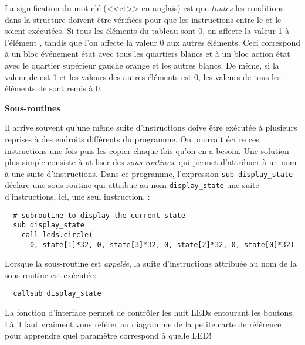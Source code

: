 La signification du mot-clé  (<<et>> en anglais) est que \emph{toutes} les conditions dans 
la structure  doivent être vérifiées pour que les instructions entre le
 et le  soient exécutées.
Si tous les éléments du tableau  sont 0, on affecte la valeur 1 à l'élément ,
tandis que l'on affecte la valeur 0 aux autres éléments.
Ceci correspond à un bloc événement état avec tous les quartiers blancs
et à un bloc action état avec le quartier supérieur gauche orange et les autres blancs.
De même, si la valeur de  est 1 et les valeurs des autres éléments est 0,
les valeurs de tous les éléments de  sont remis à 0.

\textbf{\large Sous-routines}

Il arrive souvent qu'une même suite d'instructions doive être exécutée à plusieurs reprises
à des endroits différents du programme.
On pourrait écrire ces instructions une fois puis les copier chaque fois qu'on en a besoin.
Une solution plus simple consiste à utiliser des \emph{sous-routines}, qui permet
d'attribuer à un nom à une suite d'instructions.
Dans ce programme, l'expression {\footnotesize\verb+sub display_state+} déclare une
sous-routine qui attribue au nom {\footnotesize\verb+display_state+} une suite d'instructions,
ici, une seul instruction, :

\bigskip

\begin{footnotesize}
\begin{verbatim}
  # subroutine to display the current state
  sub display_state
    call leds.circle(
      0, state[1]*32, 0, state[3]*32, 0, state[2]*32, 0, state[0]*32)
\end{verbatim}
\end{footnotesize}

Lorsque la sous-routine est \emph{appelée}, la suite d'instructions attribuée au nom de la sous-routine
est exécutée:
\vspace{-1ex}
\begin{footnotesize}
\begin{verbatim}
  callsub display_state
\end{verbatim}
\end{footnotesize}
\vspace{-1ex}
La fonction d'interface  permet de contrôler les huit LEDs entourant les boutons.
Là il faut vraiment vous référer au diagramme de la petite carte de référence pour apprendre
quel paramètre correspond à quelle LED!

